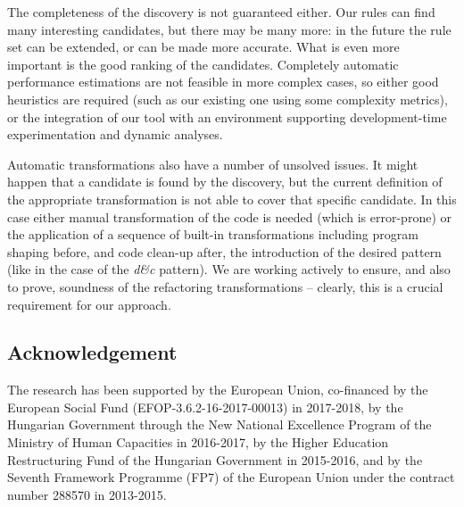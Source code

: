 \documentclass[sigconf]{acmart}
\newcommand{\dc}{\textit{d\&c}}
\begin{document}
The completeness of the discovery is not guaranteed either. Our rules can
find many interesting candidates, but there may be many more: in the future
the rule set can be extended, or can be made more accurate. What is even
more important is the good ranking of the candidates. Completely automatic
performance estimations are not feasible in more complex cases, so either
good heuristics are required (such as our existing one using some complexity
metrics), or the integration  of our tool with an environment supporting
development-time experimentation and dynamic analyses.

Automatic transformations also have a number of unsolved issues. It might
happen that a candidate is found by the discovery, but the current
definition of the appropriate transformation is not able to cover that
specific candidate. In this case either manual transformation of the code
is needed (which is error-prone) or the application of a sequence of
built-in transformations including program shaping before, and code clean-up
after, the introduction of the desired pattern (like in the case of the \dc{}
pattern). We are working actively to ensure, and also to prove, soundness
of the refactoring transformations -- clearly, this is a crucial requirement
for our approach.


\subsection*{Acknowledgement}
The research has been supported by the European Union, co-financed by the European Social Fund (EFOP-3.6.2-16-2017-00013) in 2017-2018, 
by the Hungarian Government through the New National Excellence Program of the Ministry of Human Capacities in 2016-2017, 
by the Higher Education Restructuring Fund of the Hungarian Government in 2015-2016, 
and by the Seventh Framework Programme (FP7) of the European Union under the contract number 288570 in 2013-2015.



\end{document}
